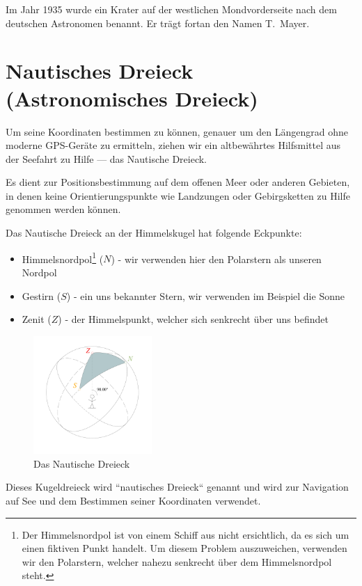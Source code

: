 \begin{refsection}
Im Jahr 1935 wurde ein Krater auf der westlichen Mondvorderseite nach dem deutschen Astronomen benannt. Er trägt fortan den Namen T.~Mayer.

\section{Nautisches Dreieck (Astronomisches Dreieck)}
Um seine Koordinaten bestimmen zu können, genauer um den Längengrad ohne moderne GPS-Geräte zu ermitteln, ziehen wir ein altbewährtes Hilfsmittel aus der Seefahrt zu Hilfe --- das Nautische Dreieck.

Es dient zur Positionsbestimmung auf dem offenen Meer oder anderen Gebieten, in denen keine Orientierungspunkte wie Landzungen oder Gebirgsketten zu Hilfe genommen werden können.

Das Nautische Dreieck an der Himmelskugel hat folgende Eckpunkte:
\begin{itemize}
\item Himmelsnordpol\footnote{%
Der Himmelsnordpol ist von einem Schiff aus nicht ersichtlich, da es sich um einen fiktiven Punkt handelt. Um diesem Problem auszuweichen, verwenden wir den Polarstern, welcher nahezu senkrecht über dem Himmelsnordpol steht.}
 ($N$) - wir verwenden hier den Polarstern als unseren Nordpol
\item Gestirn ($S$) - ein uns bekannter Stern, wir verwenden im Beispiel die Sonne
\item Zenit ($Z$) - der Himmelspunkt, welcher sich senkrecht über uns befindet
\end{itemize}

\begin{figure}[htbp]
\centering
\includegraphics[width=0.4\textwidth]{kugel/NautischesDreieck.jpg}
\caption{Das Nautische Dreieck}
\end{figure}

Dieses Kugeldreieck wird “nautisches Dreieck“ genannt und wird zur Navigation auf See und dem Bestimmen seiner Koordinaten verwendet.


\end{refsection}
